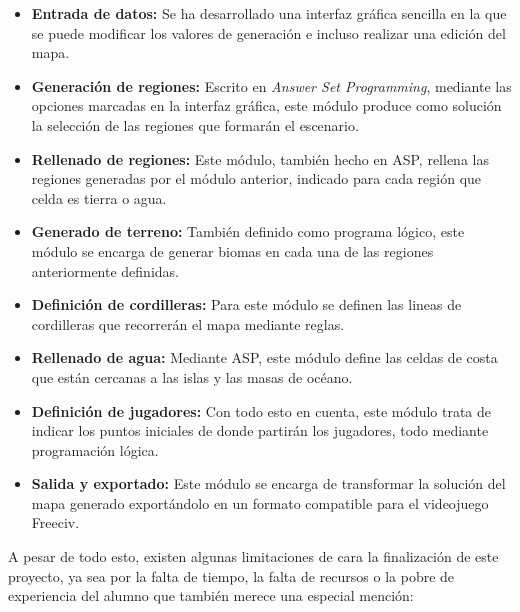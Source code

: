 \begin{itemize}
	\item \textbf{Entrada de datos:} Se ha desarrollado una interfaz gráfica sencilla en la que se puede modificar los valores de generación e incluso realizar una edición del mapa.
	\item \textbf{Generación de regiones:} Escrito en \textit{Answer Set Programming}, mediante las opciones marcadas en la interfaz gráfica, este módulo produce como solución la selección de las regiones que formarán el escenario.
	\item  \textbf{Rellenado de regiones:} Este módulo, también hecho en ASP, rellena las regiones generadas por el módulo anterior, indicado para cada región que celda es tierra o agua.
	\item \textbf{Generado de terreno:} También definido como programa lógico, este módulo se encarga de generar biomas en cada una de las regiones anteriormente definidas.
	\item \textbf{Definición de cordilleras:} Para este módulo se definen las lineas de cordilleras que recorrerán el mapa mediante reglas.
	\item \textbf{Rellenado de agua:} Mediante ASP, este módulo define las celdas de costa que están cercanas a las islas y las masas de océano.
	\item \textbf{Definición de jugadores:} Con todo esto en cuenta, este módulo trata de indicar los puntos iniciales de donde partirán los jugadores, todo mediante programación lógica.
	\item \textbf{Salida y exportado:} Este módulo se encarga de transformar la solución del mapa generado exportándolo en un formato compatible para el videojuego Freeciv.
\end{itemize}

A pesar de todo esto, existen algunas limitaciones de cara la finalización de este proyecto, ya sea por la falta de tiempo, la falta de recursos o la pobre de experiencia del alumno que también merece una especial mención:

